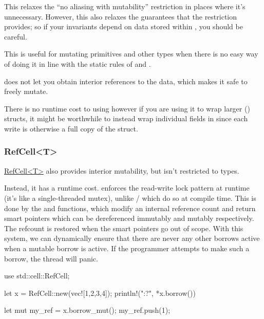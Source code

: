 This relaxes the \enquote{no aliasing with mutability} restriction in places where it's unnecessary. However, this also 
relaxes the guarantees that the restriction provides; so if your invariants depend on data stored within , you 
should be careful.

\blank

This is useful for mutating primitives and other  types when there is no easy way of doing it in line with the 
static rules of \code{\&} and .

\blank

 does not let you obtain interior references to the data, which makes it safe to freely mutate.


There is no runtime cost to using  however if you are using it to wrap larger () structs, 
it might be worthwhile to instead wrap individual fields in  since each write is otherwise a full copy of 
the struct.

\subsubsection*{RefCell<T>}

\href{https://doc.rust-lang.org/std/cell/struct.RefCell.html}{RefCell<T>} also provides interior mutability, but isn't 
restricted to  types.

\blank

Instead, it has a runtime cost.  enforces the read-write lock pattern at runtime (it's like a single-threaded 
mutex), unlike / which do so at compile time. This is done by the  and 
 functions, which modify an internal reference count and return smart pointers which can be dereferenced 
immutably and mutably respectively. The refcount is restored when the smart pointers go out of scope. With this system, we 
can dynamically ensure that there are never any other borrows active when a mutable borrow is active. If the programmer attempts 
to make such a borrow, the thread will panic.

\begin{rustc}
use std::cell::RefCell;

let x = RefCell::new(vec![1,2,3,4]);
{
    println!("{:?}", *x.borrow())
}

{
    let mut my_ref = x.borrow_mut();
    my_ref.push(1);
}
\end{rustc}

